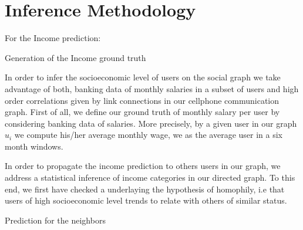 \section{Inference Methodology}





For the Income prediction:

Generation of the Income ground truth

In order to infer the socioeconomic level of users on the social graph we take advantage of both, banking data of monthly salaries in a subset of users and high order correlations given by link connections in our cellphone communication graph. 
First of all, we define our ground truth of monthly salary per user by considering banking data of salaries. More precisely, by a given user in our graph $u_i$ we compute his/her average monthly wage, we as the average user in a six month windows.  

In order to propagate the income prediction to others users in our graph, we address a statistical inference of income categories in our directed graph. To this end, we first have checked a underlaying the hypothesis of homophily, i.e that users of high socioeconomic level trends to relate with others of similar status.


Prediction for the neighbors

